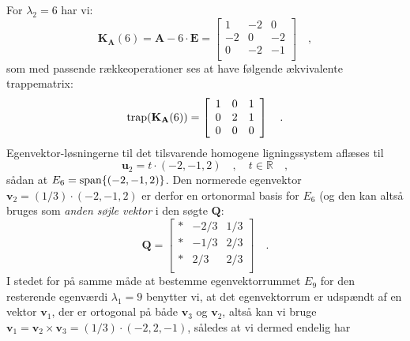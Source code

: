 \begin{example}
For $\lambda_{2}  = 6$ har vi:
\begin{equation}
\mathbf{K}_{\mathbf{A}}(6) = \mathbf{A} - 6\cdot\mathbf{E} = \left[
                                          \begin{array}{rrr}
                                           1  & -2  & 0 \\
                                            -2 &  0 &  -2\\
                                            0 &  -2 & -1 \\
                                          \end{array}
                                        \right] \quad ,
\end{equation}
som med passende rækkeoperationer ses at have følgende ækvivalente trappematrix:
\begin{equation}
\mathrm{trap}(\mathbf{K}_{\mathbf{A}}(6)) = \left[
                                          \begin{array}{rrr}
                                            1 &  0 & 1 \\
                                            0 & 2 & 1 \\
                                            0 & 0& 0 \\
                                          \end{array}
                                        \right] \quad .
\end{equation}
Egenvektor-løsningerne til det tilsvarende homogene ligningssystem aflæses til
\begin{equation}
\mathbf{u}_{2} = t\cdot(-2, -1, 2)\quad , \quad t \in \mathbb{R} \quad ,
 \end{equation}
 sådan at $E_{6}= \mathrm{span}\{(-2, -1, 2)\}$. Den normerede egenvektor $\mathbf{v}_{2} = (1/3)\cdot (-2, -1, 2)$ er derfor en ortonormal basis for $E_{6}$ (og den kan altså bruges som {\textit{anden søjle vektor}} i den søgte $\mathbf{Q}$:
\begin{equation}
\mathbf{Q}= \left[
          \begin{array}{rrr}
            * & -2/3 & 1/3 \\
            * & -1/3 & 2/3 \\
            * & 2/3 & 2/3 \\
          \end{array}
        \right] \quad .
\end{equation}
I stedet for på samme måde at bestemme egenvektorrummet $E_{9}$ for den resterende egenværdi $\lambda_{1} = 9$ benytter vi, at det egenvektorrum er udspændt af en vektor $\mathbf{v}_{1}$, der er ortogonal på både $\mathbf{v}_{3}$ og $\mathbf{v}_{2}$, altså kan vi bruge $\mathbf{v}_{1} = \mathbf{v}_{2} \times \mathbf{v}_{3} = (1/3) \cdot (-2, 2, -1)$, således at vi dermed endelig har

\end{example}
